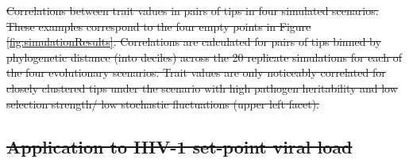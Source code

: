 \documentclass[12pt]{article} %
\providecommand{\DIFdel}[1]{{\protect\color{red}\sout{#1}}}                      %
\providecommand{\DIFdelbegin}{} %
\providecommand{\DIFdelFL}[1]{\DIFdel{#1}} %
\newcommand{\DIFscaledelfig}{0.5}
\newlength{\DIFdelgraphicswidth} %
\newlength{\DIFdelgraphicsheight} %
\newcommand{\DIFdelincludegraphics}[2][]{%
\sbox{\DIFdelgraphicsbox}{\DIFOincludegraphics[#1]{#2}}%
\settoboxwidth{\DIFdelgraphicswidth}{\DIFdelgraphicsbox} %
\settoboxtotalheight{\DIFdelgraphicsheight}{\DIFdelgraphicsbox} %
\scalebox{\DIFscaledelfig}{%
\parbox[b]{\DIFdelgraphicswidth}{\usebox{\DIFdelgraphicsbox}\\[-\baselineskip] \rule{\DIFdelgraphicswidth}{0em}}\llap{\resizebox{\DIFdelgraphicswidth}{\DIFdelgraphicsheight}{%
\setlength{\unitlength}{\DIFdelgraphicswidth}%
\begin{picture}(1,1)%
\thicklines\linethickness{2pt} %
{\color[rgb]{1,0,0}\put(0,0){\framebox(1,1){}}}%
{\color[rgb]{1,0,0}\put(0,0){\line( 1,1){1}}}%
{\color[rgb]{1,0,0}\put(0,1){\line(1,-1){1}}}%
\end{picture}%
}\hspace*{3pt}}} %
} %
\DeclareRobustCommand{\DIFdelbegin}{\DIFOdelbegin \let\includegraphics\DIFdelincludegraphics} %
\begin{document}
\begin{doublespace}
\DIFdelbegin %
{%
\DIFdelFL{Correlations between trait values in pairs of tips in four simulated scenarios. These examples correspond to the four empty points in Figure \ref{fig:simulationResults}. Correlations are calculated for pairs of tips binned by phylogenetic distance (into deciles) across the 20 replicate simulations for each of the four evolutionary scenarios. Trait values are only noticeably correlated for closely clustered tips under the scenario with high pathogen heritability and low selection strength/ low stochastic fluctuations (upper left facet).}}

\subsection*{\DIFdel{Application to HIV-1 set-point viral load}}


\end{doublespace}
\end{document}
